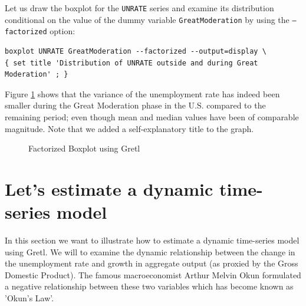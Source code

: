 \documentclass[11pt]{article}
\begin{document}
Let us draw the boxplot for the \texttt{UNRATE} series and examine its distribution conditional on the value of the dummy variable \texttt{GreatModeration} by using the \texttt{---factorized} option: 
\begin{Verbatim}[baselinestretch=0.75, fontsize=\small]
boxplot UNRATE GreatModeration --factorized --output=display \
{ set title 'Distribution of UNRATE outside and during Great Moderation' ; }
\end{Verbatim}
Figure \ref{fig:Plot2} shows that the variance of the unemployment rate has indeed been smaller during the Great Moderation phase in the U.S. compared to the remaining period; even though mean and median values have been of comparable magnitude. Note that we added a self-explanatory title to the graph.

\begin{figure}[h!]
	\centering
	\caption{Factorized Boxplot using Gretl}
	\label{fig:Plot2}
\end{figure}



\section{Let's estimate a dynamic time-series model}
In this section we want to illustrate how to estimate a dynamic time-series model using Gretl. We will to examine the dynamic relationship between the change in the unemployment rate and growth in aggregate output (as proxied by the Gross Domestic Product). The famous macroeconomist Arthur Melvin Okun formulated a negative relationship between these two variables which has become known as 'Okun's Law'.
\end{document}
